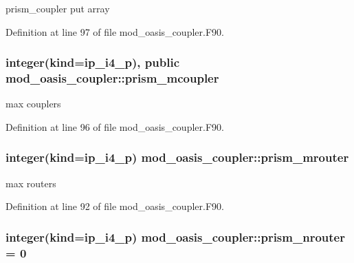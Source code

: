 prism\+\_\+coupler put array 



Definition at line 97 of file mod\+\_\+oasis\+\_\+coupler.\+F90.

\hypertarget{classmod__oasis__coupler_aaa019c39b0f657e7c37820697ecf354a}{
\subsubsection[{prism\+\_\+mcoupler}]{\setlength{\rightskip}{0pt plus 5cm}integer(kind=ip\+\_\+i4\+\_\+p), public mod\+\_\+oasis\+\_\+coupler\+::prism\+\_\+mcoupler}}\label{classmod__oasis__coupler_aaa019c39b0f657e7c37820697ecf354a}


max couplers 



Definition at line 96 of file mod\+\_\+oasis\+\_\+coupler.\+F90.

\hypertarget{classmod__oasis__coupler_a6d46883e9df70ab9cdafaf607afacacb}{
\subsubsection[{prism\+\_\+mrouter}]{\setlength{\rightskip}{0pt plus 5cm}integer(kind=ip\+\_\+i4\+\_\+p) mod\+\_\+oasis\+\_\+coupler\+::prism\+\_\+mrouter\hspace{0.3cm}{\ttfamily [private]}}}\label{classmod__oasis__coupler_a6d46883e9df70ab9cdafaf607afacacb}


max routers 



Definition at line 92 of file mod\+\_\+oasis\+\_\+coupler.\+F90.

\hypertarget{classmod__oasis__coupler_a2ebdb255598e1b004de2533f16b06e04}{
\subsubsection[{prism\+\_\+nrouter}]{\setlength{\rightskip}{0pt plus 5cm}integer(kind=ip\+\_\+i4\+\_\+p) mod\+\_\+oasis\+\_\+coupler\+::prism\+\_\+nrouter = 0\hspace{0.3cm}{\ttfamily [private]}}}\label{classmod__oasis__coupler_a2ebdb255598e1b004de2533f16b06e04}


